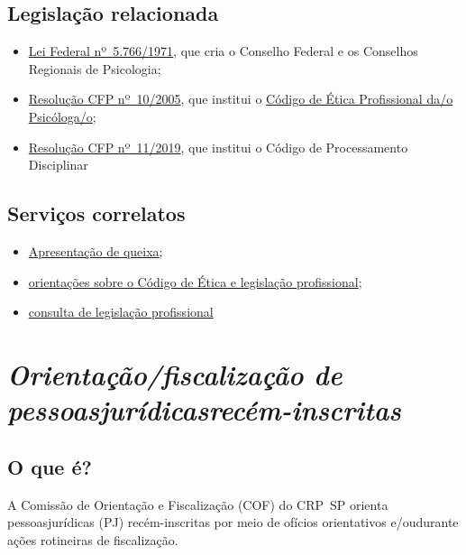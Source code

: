 \section{Legislação relacionada}

\begin{itemize}
  \item  \href{http://www.planalto.gov.br/ccivil_03/leis/l5766.htm}{Lei Federal  nº~5.766/1971}, que cria o Conselho Federal e os Conselhos Regionais  de Psicologia;
  \item  \href{https://atosoficiais.com.br/cfp/resolucao-do-exercicio-profissional-n-10-2005-aprova-o-codigo-de-etica-profissional-do-psicologo}{Resolução  CFP nº~10/2005}, que institui o  \href{https://www.crpsp.org/uploads/pagina/289379/2j9LIMPLJ9jFr5YrK57HmAiBWjVMxdbe.pdf}{Código  de Ética Profissional da/o Psicóloga/o};
  \item  \href{https://atosoficiais.com.br/lei/codigo-de-processamento-disciplinar-cfp}{Resolução  CFP nº~11/2019}, que institui o Código de Processamento Disciplinar
\end{itemize}

\section{Serviços correlatos}

\begin{itemize}
  \item  \hyperref[]{Apresentação de queixa};
  \item  \hyperref[]{orientações  sobre o Código de Ética e legislação profissional};
  \item  \hyperref[]{consulta de  legislação profissional}
\end{itemize}

\chapter{\texorpdfstring{\emph{Orientação/fiscalização de pessoasjurídicasrecém-inscritas}}{Orientação/fiscalização de pessoas jurídicas recém-inscritas}}


\section{O que é?}

A Comissão de Orientação e Fiscalização (COF) do CRP~SP orienta pessoasjurídicas (PJ) recém-inscritas por meio de ofícios orientativos e/oudurante ações rotineiras de fiscalização.

